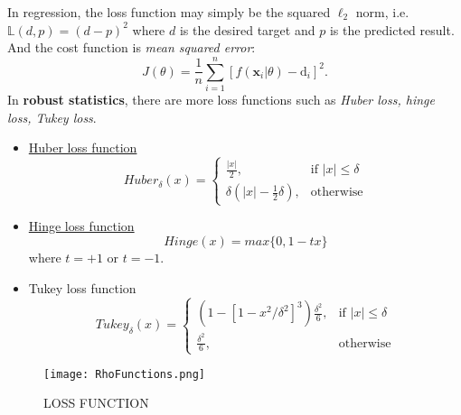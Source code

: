 \documentclass[titlestyle=hang,11pt]{elegantbook}
\begin{document}


In regression, the loss function may simply be the squared $\ell_2$ norm, i.e. $\mathbb{L}(d,p)=(d-p)^{2}$ where $d$ is the desired target and $p$ is the predicted result. 
And the cost function is \emph{mean squared error}:
$$ J(\theta)=\frac{1}{n}\sum_{i=1}^{n}[f(\mathbf{x}_i|\theta)-\mathrm{d}_i]^2.$$
In \textbf{robust statistics}, there are more loss functions such as \emph{Huber loss, hinge loss, Tukey loss}.
\par
\begin{itemize}
\item \href{https://www.wikiwand.com/en/Huber_loss}{Huber loss function}
   $$Huber_{\delta}(x)=
        \begin{cases}
            \frac{|x|}{2},&\text{if $|x|\leq\delta$}\\
            \delta(|x|-\frac{1}{2}\delta),&\text{otherwise}
        \end{cases}
   $$

\item \href{https://www.wikiwand.com/en/Hinge_loss}{Hinge loss function}
  $$Hinge(x)=max\{0, 1-tx\}$$
  where $t=+1$ or $t=-1$.

\item Tukey loss function
   $$
	Tukey_{\delta}(x)=
	\begin{cases}
         (1-[1-x^2/\delta^2]^3)\frac{\delta^2}{6},&\text{if $|x|\leq\delta$}\\
         \frac{\delta^2}{6},                      &\text{otherwise}
    \end{cases}
   $$

\end{itemize}
\par

\begin{figure}[!htbp]
	\centering
	\texttt{[image: RhoFunctions.png]}
	\caption{LOSS FUNCTION\label{fig:loss}}
\end{figure}
\end{document}
